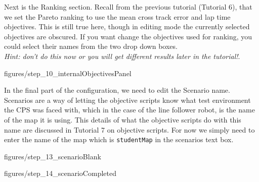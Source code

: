 \documentclass[11pt,a4paper]{../tutorial}
\begin{document}
{Next is the Ranking section.  Recall from the previous tutorial (Tutorial 6), that we set the Pareto ranking to use the mean cross track error and lap time objectives. This is still true here, though in editing mode the currently selected objectives are obscured.  If you want change the objectives used for ranking, you could select their names from the two drop down boxes. \\ \emph{Hint: don’t do this now or you will get different results later in the tutorial!}.

\begin{center}\begin{annotation}[width=0.7\linewidth,trim=0 0 0 0,clip]{figures/step_10_internalObjectivesPanel}
    \end{annotation}\end{center}

 \newpage
In the final part of the configuration, we need to edit the Scenario name. Scenarios are a way of letting the objective scripts know what test environment the CPS was faced with, which in the case of the line follower robot, is the name of the map it is using. This details of what the objective scripts do with this name are discussed in Tutorial 7 on objective scripts.  For now we simply need to enter the name of the map which is \verb=studentMap= in the scenarios text box.



\begin{center}\begin{annotation}[width=0.7\linewidth,trim=0 0 0 0,clip]{figures/step_13_scenarioBlank}
    \end{annotation}\end{center}






\begin{center}\begin{annotation}[width=0.7\linewidth,trim=0 0 0 0,clip]{figures/step_14_scenarioCompleted}
    \end{annotation}\end{center}


}
\end{document}
